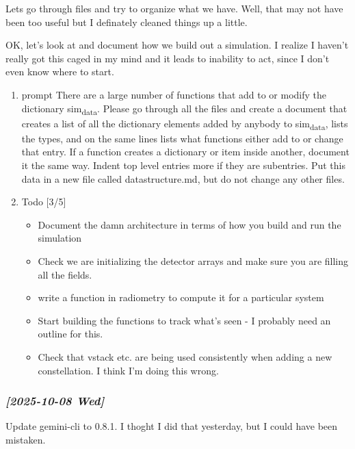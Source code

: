 \documentclass[11pt]{article}
\begin{document}
Lets go through files and try to organize what we have. Well, that may
not have been too useful but I definately cleaned things up a little.


OK, let's look at and document how we build out a simulation.
I realize I haven't really got this caged in my mind and it leads to inability
to act, since I don't even know where to start.

\begin{enumerate}
\item prompt
\label{sec:orgb7d8a04}
There are a large number of functions that add to or modify the dictionary sim\textsubscript{data}.  Please go through all
   the files and create a document that creates a list of all the dictionary elements added by anybody to 
  sim\textsubscript{data}, lists the types, and on the same lines lists what functions either add to or change that entry.  
  If a function creates a dictionary or item inside another, document it the same way.  Indent top level 
  entries more if they are subentries.  Put this data in a new file called datastructure.md, but do not 
  change any other files.

\item Todo  [3/5]
\label{sec:orgda01299}
\begin{itemize}
\item[{$\square$}] Document the damn architecture in terms of how you build and run
the simulation
\item[{$\square$}] Check we are initializing the detector arrays and make sure you are filling
all the fields.
\item[{$\square$}] write a function in radiometry to compute it for a particular system
\item[{$\square$}] Start building the functions to track what's seen - I probably need
an outline for this.
\item[{$\square$}] Check that vstack etc. are being used consistently when adding a new constellation.
I think I'm doing this wrong.
\end{itemize}
\end{enumerate}




\subsubsection{\textit{[2025-10-08 Wed]}}
\label{sec:org60dfbe4}
Update gemini-cli  to 0.8.1.  I thoght I did that yesterday, but I could have
been mistaken.
\end{document}
